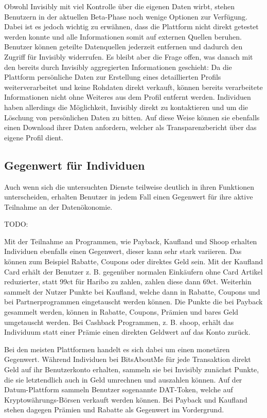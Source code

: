 \noindent Obwohl Invisibly mit viel Kontrolle über die eigenen Daten wirbt, stehen Benutzern in der aktuellen Beta-Phase noch wenige Optionen zur Verfügung. Dabei ist es jedoch wichtig zu erwähnen, dass die Plattform nicht direkt getestet werden konnte und alle Informationen somit auf externen Quellen beruhen. Benutzer können geteilte Datenquellen jederzeit entfernen und dadurch den Zugriff für Invisibly widerrufen. Es bleibt aber die Frage offen, was danach mit den bereits durch Invisibly aggregierten Informationen geschieht: Da die Plattform persönliche Daten zur Erstellung eines detaillierten Profils weiterverarbeitet und keine Rohdaten direkt verkauft, können bereits verarbeitete Informationen nicht ohne Weiteres aus dem Profil entfernt werden. Individuen haben allerdings die Möglichkeit, Invisibly direkt zu kontaktieren und um die Löschung von persönlichen Daten zu bitten. Auf diese Weise können sie ebenfalls einen Download ihrer Daten anfordern, welcher als Transparenzbericht über das eigene Profil dient.

\subsection{Gegenwert für Individuen}
Auch wenn sich die untersuchten Dienste teilweise deutlich in ihren Funktionen unterscheiden, erhalten Benutzer in jedem Fall einen Gegenwert für ihre aktive Teilnahme an der Datenökonomie. \newline

TODO:

\noindent Mit der Teilnahme an Programmen, wie Payback, Kaufland und Shoop erhalten Individuen ebenfalls einen Gegenwert, dieser kann sehr stark variieren. Das können zum Beispiel Rabatte, Coupons oder direktes Geld sein. 
Mit der Kaufland Card erhält der Benutzer z. B. gegenüber normalen Einkäufern ohne Card Artikel reduzierter, statt 99ct für Haribo zu zahlen, zahlen diese dann 69ct. Weiterhin sammelt der Nutzer Punkte bei Kaufland, welche dann in Rabatte, Coupons und bei Partnerprogrammen eingetauscht werden können. Die Punkte die bei Payback gesammelt werden, können in Rabatte, Coupons, Prämien und bares Geld umgetauscht werden.
Bei Cashback Programmen, z. B. shoop, erhält das Individuum statt einer Prämie einen direkten Geldwert auf das Konto zurück. 



\noindent Bei den meisten Plattformen handelt es sich dabei um einen monetären Gegenwert. Während Individuen bei BitsAboutMe für jede Transaktion direkt Geld auf ihr Benutzerkonto erhalten, sammeln sie bei Invisibly zunächst Punkte, die sie letztendlich auch in Geld umrechnen und auszahlen können. Auf der Datum-Plattform sammeln Benutzer sogenannte DAT-Token, welche auf Kryptowährungs-Börsen verkauft werden können. Bei Payback und Kaufland stehen dagegen Prämien und Rabatte als Gegenwert im Vordergrund.\newline

